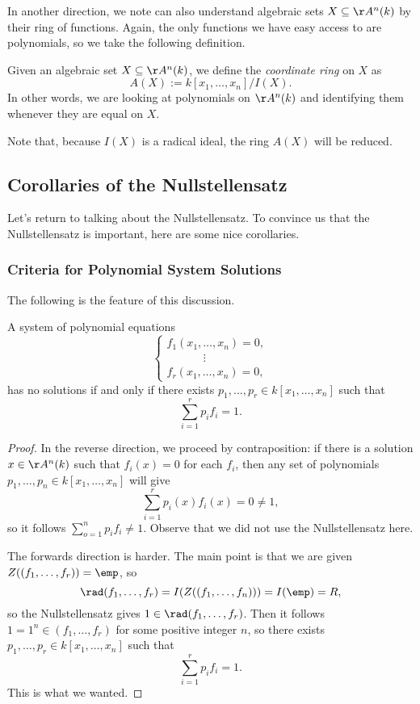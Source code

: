 In another direction, we note can also understand algebraic sets $X\subseteq\AA^n(k)$ by their ring of functions. Again, the only functions we have easy access to are polynomials, so we take the following definition.
\begin{definition}
	Given an algebraic set $X\subseteq\AA^n(k)$, we define the \textit{coordinate ring} on $X$ as
	\[A(X):=k[x_1,\ldots,x_n]/I(X).\]
	In other words, we are looking at polynomials on $\AA^n(k)$ and identifying them whenever they are equal on $X$.
\end{definition}
Note that, because $I(X)$ is a radical ideal, the ring $A(X)$ will be reduced.

\subsection{Corollaries of the Nullstellensatz}
Let's return to talking about the Nullstellensatz. To convince us that the Nullstellensatz is important, here are some nice corollaries.

\subsubsection{Criteria for Polynomial System Solutions}
The following is the feature of this discussion.
\begin{corollary}
	A system of polynomial equations
	\[\begin{cases}
		f_1(x_1,\ldots,x_n) = 0, \\
		\qquad\quad~\vdots \\
		f_r(x_1,\ldots,x_n) = 0,
	\end{cases}\]
	has no solutions if and only if there exists $p_1,\ldots,p_r\in k[x_1,\ldots,x_n]$ such that
	\[\sum_{i=1}^rp_if_i=1.\]
\end{corollary}
\begin{proof}
	In the reverse direction, we proceed by contraposition: if there is a solution $x\in\AA^n(k)$ such that $f_i(x)=0$ for each $f_i$, then any set of polynomials $p_1,\ldots,p_n\in k[x_1,\ldots,x_n]$ will give
	\[\sum_{i=1}^rp_i(x)f_i(x)=0\ne1,\]
	so it follows $\sum_{o=1}^np_if_i\ne1$. Observe that we did not use the Nullstellensatz here.

	The forwards direction is harder. The main point is that we are given $Z((f_1,\ldots,f_r))=\emp$, so
	\[\rad(f_1,\ldots,f_r)=I(Z((f_1,\ldots,f_n)))=I(\emp)=R,\]
	so the Nullstellensatz gives $1\in\rad(f_1,\ldots,f_r)$. Then it follows $1=1^n\in(f_1,\ldots,f_r)$ for some positive integer $n$, so there exists $p_1,\ldots,p_r\in k[x_1,\ldots,x_n]$ such that
	\[\sum_{i=1}^rp_if_i=1.\]
	This is what we wanted.
\end{proof}

